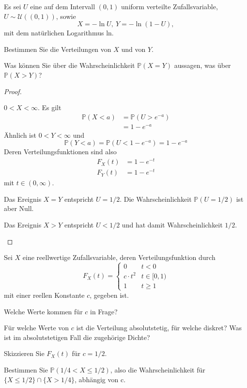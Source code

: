 \begin{Problem}
	Es sei $U$ eine auf dem Intervall $(0, 1)$ uniform verteilte Zufallsvariable, $U \sim \mathcal{U}((0, 1))$, sowie
	\[X=-\ln U,~Y=-\ln (1-U),\]
	mit dem natürlichen Logarithmus ln.
	\begin{parts}
		\item Bestimmen Sie die Verteilungen von $X$ und von $Y$.
		\item Was können Sie über die Wahrscheinlichkeit $\mathbb{P}(X = Y )$ aussagen, was über
		$\mathbb{P}(X > Y )$?
	\end{parts}
\end{Problem}
\begin{proof}
	\begin{parts}
		\item $0 < X < \infty$. Es gilt 
		\begin{align*}
			\mathbb{P}(X < a)&=\mathbb{P}(U>e^{-a})\\
			&=1-e^{-a}
		\end{align*}
	Ähnlich ist $0<Y<\infty$ und
	\[\mathbb{P}(Y<a)=\mathbb{P}(U<1 - e^{-a})=1 - e^{-a}\]
	Deren Verteilungsfunktionen sind also
	\begin{align*}
		F_X(t)&= 1-e^{-t}\\
		F_Y(t)&= 1-e^{-t}
	\end{align*}
mit $t\in (0,\infty)$. 
\item Das Ereignis $X=Y$ entspricht $U=1/2$. Die Wahrscheinlichkeit $\mathbb{P}(U=1/2)$ ist aber Null.

Das Ereignis $X>Y$ entspricht $U<1/2$ und hat damit Wahrscheinlichkeit $1/2$.\qedhere
	\end{parts}
\end{proof}
\begin{Problem}
	Sei $X$ eine reellwertige Zufallsvariable, deren Verteilungsfunktion durch
	\[F_X(t)=\begin{cases}
		0 & t < 0\\
		c\cdot t^2 & t \in [0,1)\\
		1 & t \ge 1
	\end{cases}\]
mit einer reellen Konstante $c$, gegeben ist.
\begin{parts}
	\item Welche Werte kommen für $c$ in Frage?
	\item Für welche Werte von $c$ ist die Verteilung absolutstetig, für welche diskret? Was ist im absolutstetigen Fall die zugehörige Dichte?
	\item Skizzieren Sie $F_X(t)$ für $c = 1/2$.
	\item Bestimmen Sie $\mathbb{P}(1/4 < X \le 1/2)$, also die Wahrscheinlichkeit für $\{X \le 1/2\}\cap \{X > 1/4\}$, abhängig von c.
\end{parts}
\end{Problem}
